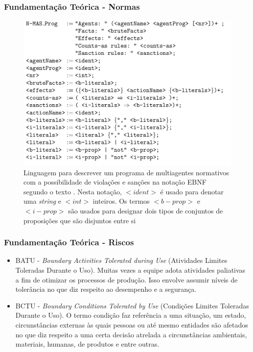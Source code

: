 \documentclass{beamer}
\begin{document}
\begin{frame}
	\frametitle{Fundamentação Teórica - Normas}
	\begin{figure}[H]
	  \centering
	  \includegraphics[width=0.5\linewidth]{figure/masprogram.png} 
	  \caption{Linguagem para descrever um programa de multiagentes normativos com a possibilidade de violações e sanções na notação EBNF segundo o texto \cite{dastaniframework}. Nesta notação, $<ident>$ é usado para denotar uma \textit{string} e $<int>$ inteiros. Os termos $<b-prop>$ e $<i-prop>$ são usados para designar dois tipos de conjuntos de proposições que são disjuntos entre si}
	  \label{descreveprograma}
	\end{figure}
\end{frame}


\begin{frame}
	\frametitle{Fundamentação Teórica - Riscos}
	\begin{itemize}
		\item BATU - \textit{Boundary Activities Tolerated during Use} (Atividades Limites Toleradas Durante o Uso). Muitas vezes a equipe adota atividades paliativas a fim de otimizar os processos de produção. Isso envolve assumir níveis de tolerância no que diz respeito ao desempenho e a segurança. 
		\item BCTU - \textit{Boundary Conditions Tolerated by Use} (Condições Limites Toleradas Durante o Uso). O termo condição faz referência a uma situação, um estado, circunstâncias externas às quais pessoas ou até mesmo entidades são afetados no que diz respeito a uma certa decisão atrelada a circunstâncias ambientais, materiais, humanas, de produtos e entre outras.
	\end{itemize}
\end{frame}
\end{document}

